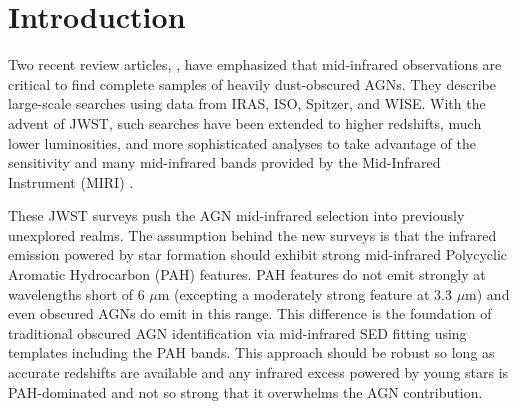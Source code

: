 \documentclass[twocolumn]{aastex63}
\begin{document}
\begin{abstract}

We evaluate the underlying assumptions for the identification of Active Galactic Nuclei (AGNs) through near- and mid-infrared photometry and spectral energy distribution (SED) fitting out to z $\sim$ 3. For massive galaxies, $log(M) \ge 9.5$, our high resolution spectra of the rest optical range generally confirm the results of SED fitting, which relies primarily on excesses above the stellar emission between 1 and 6 $\mu$m to identify AGN. However, the method is undermined if the redshift used for the SED fitting is incorrect. Low mass galaxies, $log(M) < 9.5$, can contain relatively warm dust that emits in the 4 - 6 $\mu$m range. We show that the potential contamination of AGN samples by purely star forming low-mass galaxies  can be avoided by the use of the infrared properties of Haro 11 as a limiting star-forming SED template. However, relatively few star forming galaxies emit as strongly in the 3--6 $\mu$m range as this template, so this could result in missing some obscured AGNs to avoid a minor contamination. Including the behavior of the galaxies at rest $\lambda \sim$ 13.5 $\mu$m can mitigate this problem and yield more complete  samples of {\it bona fide} AGN. JWST/MIRI supports this approach out to z $\lesssim$ 0.6.

\end{abstract}

\section{Introduction}

Two recent review articles, \citet{Hickox2018, Lyu2022}, have emphasized that mid-infrared observations are critical to find complete samples of heavily dust-obscured AGNs. They describe  large-scale searches using data from IRAS, ISO, Spitzer, and WISE. With the advent of JWST, such searches have been extended to higher redshifts, much lower luminosities, and more sophisticated analyses to take advantage of the sensitivity and many mid-infrared bands provided by the Mid-Infrared Instrument (MIRI) \citep{Yang2023, Kirkpatrick2023,  Lyu2024, Li2024, Chien2024}.

These JWST surveys push the AGN mid-infrared selection into previously unexplored realms.  The assumption behind the new surveys is that the infrared emission powered by star formation should exhibit strong mid-infrared Polycyclic 
Aromatic Hydrocarbon (PAH) features. PAH features do not emit strongly at wavelengths short of 6 $\mu$m (excepting a moderately strong feature at 3.3 $\mu$m) and even obscured AGNs do emit in this range. This difference is the foundation of traditional obscured AGN identification via mid-infrared SED fitting using templates including the PAH bands. This approach should be robust so long as accurate redshifts are available and any infrared excess powered by young stars is PAH-dominated and not so strong that it overwhelms the AGN contribution. 
\end{document}
